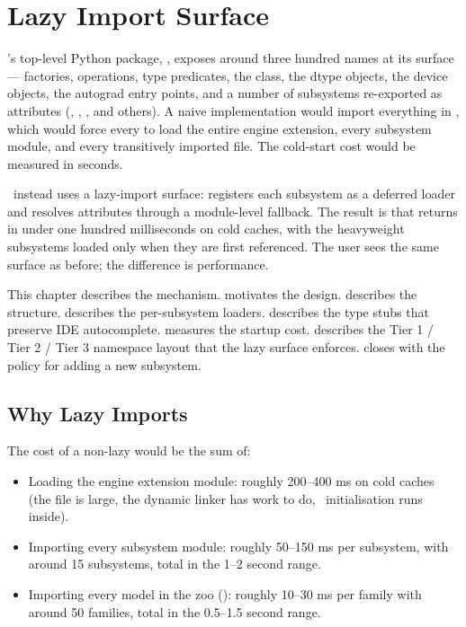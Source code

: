 \chapter{Lazy Import Surface}
\label{ch:lazy_imports}

\Lucid's top-level Python package, , exposes around
three hundred names at its surface --- factories, operations,
type predicates, the  class, the dtype objects, the
device objects, the autograd entry points, and a number of
subsystems re-exported as attributes (,
, , and others). A naive
implementation would import everything in ,
which would force every  to load the entire
engine extension, every subsystem module, and every transitively
imported file. The cold-start cost would be measured in seconds.

\Lucid\ instead uses a lazy-import surface: 
registers each subsystem as a deferred loader and resolves
attributes through a module-level  fallback.
The result is that  returns in under one
hundred milliseconds on cold caches, with the heavyweight
subsystems loaded only when they are first referenced. The user
sees the same surface as before; the difference is performance.

This chapter describes the mechanism. 
motivates the design.  describes
the  structure.
 describes the per-subsystem
loaders.  describes the
 type stubs that preserve IDE autocomplete.
 measures the startup cost.
 describes the Tier 1 / Tier 2 /
Tier 3 namespace layout that the lazy surface enforces.
 closes with the policy for adding
a new subsystem.

\section{Why Lazy Imports}
\label{sec:lazy_imports:why}

The cost of a non-lazy  would be the sum of:

\begin{itemize}
  \item Loading the engine extension module: roughly 200--400 ms
    on cold caches (the  file is large, the dynamic
    linker has work to do, \MLX\ initialisation runs inside).
  \item Importing every subsystem module: roughly 50--150 ms per
    subsystem, with around 15 subsystems, total in the 1--2 second
    range.
  \item Importing every model in the zoo
    (): roughly 10--30 ms per family with
    around 50 families, total in the 0.5--1.5 second range.
\end{itemize}

